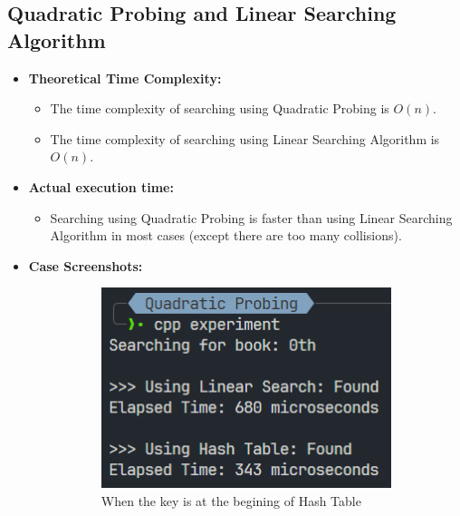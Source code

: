 \pagebreak
\subsection{Quadratic Probing and Linear Searching Algorithm}
\begin{itemize}
	\item \textbf{Theoretical Time Complexity:}
	      \begin{itemize}
		      \item The time complexity of searching using Quadratic Probing is \(O(n)\).
		      \item The time complexity of searching using Linear Searching Algorithm is \(O(n)\).
	      \end{itemize}
	\item \textbf{Actual execution time:}
	      \begin{itemize}
		      \item Searching using Quadratic Probing is faster than using Linear Searching Algorithm in most cases (except there are too many collisions).
	      \end{itemize}
	\item \textbf{Case Screenshots:}
	      \begin{figure}[!ht]
		      \centering
		      \begin{subfigure}{0.45\textwidth}
			      \centering
			      \includegraphics[width=\textwidth]{imgs/Quadratic Probing/beg.png}
			      \caption{When the key is at the begining of Hash Table}\label{fig:quadprobing-beg-metric}
		      \end{subfigure}
		      \hfill
		      \begin{subfigure}{0.45\textwidth}

\end{subfigure}
\end{figure}
\end{itemize}
